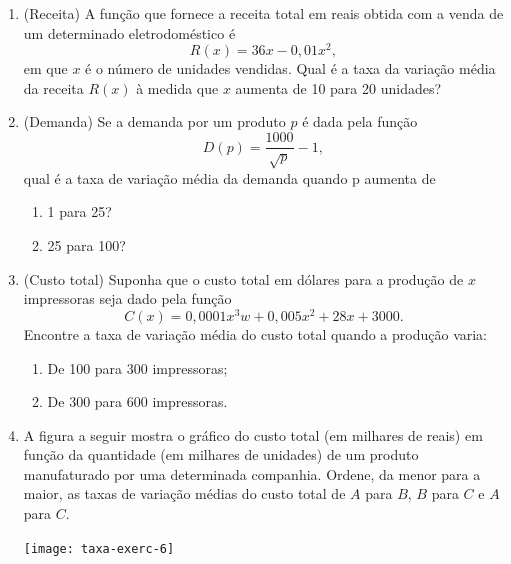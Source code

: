 \begin{enumerate}
    \item (Receita) A função que fornece a receita total em reais obtida com a venda de um determinado eletrodoméstico é
\[ R(x) = 36x - 0,01x^2,\]
em que $x$ é o número de unidades vendidas. Qual é a taxa da variação média da receita $R(x)$ à medida que $x$ aumenta de 10 para 20 unidades?

\item (Demanda) Se a demanda por um produto $p$ é dada pela função 
\[D(p) = \dfrac{1000}{\sqrt{p}} - 1, \]
  qual é a taxa de variação média da demanda quando p aumenta de

  \begin{enumerate}
  \item 1 para 25?
  \item 25 para 100?
  \end{enumerate}

\item (Custo total) Suponha que o custo total em dólares para a produção de $x$ impressoras seja dado pela função
  \[C(x) = 0,0001x^3 w + 0,005x^2 + 28x + 3000.\]
  Encontre a taxa de variação média do custo total quando a produção varia:
  \begin{enumerate}
  \item De 100 para 300 impressoras;
  \item De 300 para 600 impressoras.
  \end{enumerate}

\item A figura a seguir mostra o gráfico do custo total (em milhares de reais) em função da quantidade (em milhares de unidades) de um produto manufaturado por uma determinada companhia. Ordene, da menor para a maior, as taxas de variação médias do custo total de $A$ para $B$, $B$ para $C$ e $A$ para $C$.

  \begin{center}
\texttt{[image: taxa-exerc-6]}
  \end{center}


\end{enumerate}

